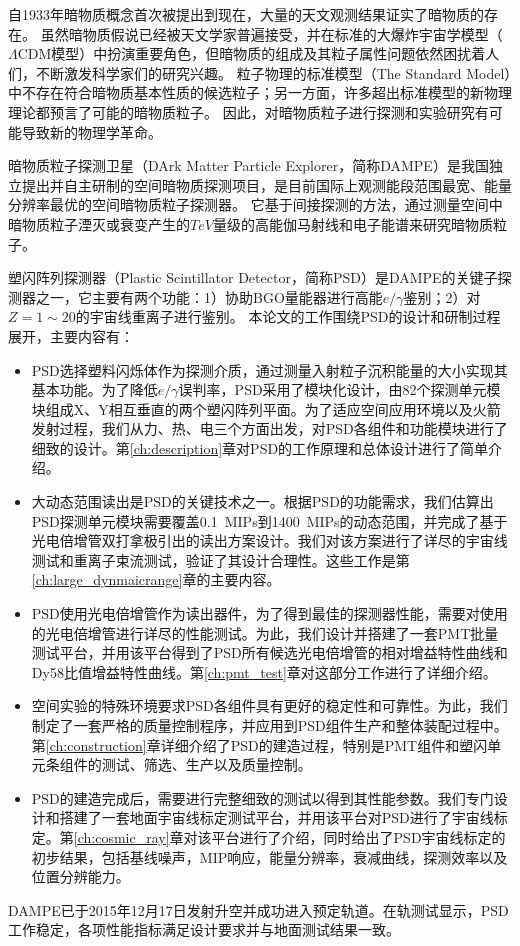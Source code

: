 
\begin{cabstract}
自1933年暗物质概念首次被提出到现在，大量的天文观测结果证实了暗物质的存在。
虽然暗物质假说已经被天文学家普遍接受，并在标准的大爆炸宇宙学模型（$\Lambda$CDM模型）中扮演重要角色，但暗物质的组成及其粒子属性问题依然困扰着人们，不断激发科学家们的研究兴趣。
粒子物理的标准模型（The Standard Model）中不存在符合暗物质基本性质的候选粒子；另一方面，许多超出标准模型的新物理理论都预言了可能的暗物质粒子。
因此，对暗物质粒子进行探测和实验研究有可能导致新的物理学革命。

暗物质粒子探测卫星（DArk Matter Particle Explorer，简称DAMPE）是我国独立提出并自主研制的空间暗物质探测项目，是目前国际上观测能段范围最宽、能量分辨率最优的空间暗物质粒子探测器。
它基于间接探测的方法，通过测量空间中暗物质粒子湮灭或衰变产生的$TeV$量级的高能伽马射线和电子能谱来研究暗物质粒子。

塑闪阵列探测器（Plastic Scintillator Detector，简称PSD）是DAMPE的关键子探测器之一，它主要有两个功能：1）协助BGO量能器进行高能$e/\gamma$鉴别；2）对$Z=1\sim 20$的宇宙线重离子进行鉴别。
本论文的工作围绕PSD的设计和研制过程展开，主要内容有：
\begin{itemize}
  \item PSD选择塑料闪烁体作为探测介质，通过测量入射粒子沉积能量的大小实现其基本功能。为了降低$e/\gamma$误判率，PSD采用了模块化设计，由82个探测单元模块组成X、Y相互垂直的两个塑闪阵列平面。为了适应空间应用环境以及火箭发射过程，我们从力、热、电三个方面出发，对PSD各组件和功能模块进行了细致的设计。第\ref{ch:description}章对PSD的工作原理和总体设计进行了简单介绍。
  \item 大动态范围读出是PSD的关键技术之一。根据PSD的功能需求，我们估算出PSD探测单元模块需要覆盖\SI{0.1}{MIPs}到\SI{1400}{MIPs}的动态范围，并完成了基于光电倍增管双打拿极引出的读出方案设计。我们对该方案进行了详尽的宇宙线测试和重离子束流测试，验证了其设计合理性。这些工作是第\ref{ch:large_dynmaicrange}章的主要内容。
  \item PSD使用光电倍增管作为读出器件，为了得到最佳的探测器性能，需要对使用的光电倍增管进行详尽的性能测试。为此，我们设计并搭建了一套PMT批量测试平台，并用该平台得到了PSD所有候选光电倍增管的相对增益特性曲线和Dy58比值增益特性曲线。第\ref{ch:pmt_test}章对这部分工作进行了详细介绍。
  \item 空间实验的特殊环境要求PSD各组件具有更好的稳定性和可靠性。为此，我们制定了一套严格的质量控制程序，并应用到PSD组件生产和整体装配过程中。第\ref{ch:construction}章详细介绍了PSD的建造过程，特别是PMT组件和塑闪单元条组件的测试、筛选、生产以及质量控制。
  \item PSD的建造完成后，需要进行完整细致的测试以得到其性能参数。我们专门设计和搭建了一套地面宇宙线标定测试平台，并用该平台对PSD进行了宇宙线标定。第\ref{ch:cosmic_ray}章对该平台进行了介绍，同时给出了PSD宇宙线标定的初步结果，包括基线噪声，MIP响应，能量分辨率，衰减曲线，探测效率以及位置分辨能力。
\end{itemize}

DAMPE已于2015年12月17日发射升空并成功进入预定轨道。在轨测试显示，PSD工作稳定，各项性能指标满足设计要求并与地面测试结果一致。

\end{cabstract}

